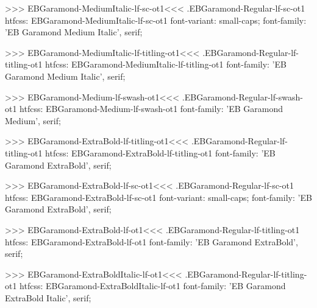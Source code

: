{{{{{{{>>>
\<EBGaramond-MediumItalic-lf-sc-ot1\><<<
.EBGaramond-Regular-lf-sc-ot1
htfcss:  EBGaramond-MediumItalic-lf-sc-ot1  font-variant: small-caps; font-family: 'EB Garamond Medium Italic', serif;

>>>
\<EBGaramond-MediumItalic-lf-titling-ot1\><<<
.EBGaramond-Regular-lf-titling-ot1
htfcss:  EBGaramond-MediumItalic-lf-titling-ot1  font-family: 'EB Garamond Medium Italic', serif;

>>>
\<EBGaramond-Medium-lf-swash-ot1\><<<
.EBGaramond-Regular-lf-swash-ot1
htfcss:  EBGaramond-Medium-lf-swash-ot1  font-family: 'EB Garamond Medium', serif;

>>>
\<EBGaramond-ExtraBold-lf-titling-ot1\><<<
.EBGaramond-Regular-lf-titling-ot1
htfcss:  EBGaramond-ExtraBold-lf-titling-ot1  font-family: 'EB Garamond ExtraBold', serif;

>>>
\<EBGaramond-ExtraBold-lf-sc-ot1\><<<
.EBGaramond-Regular-lf-sc-ot1
htfcss:  EBGaramond-ExtraBold-lf-sc-ot1  font-variant: small-caps; font-family: 'EB Garamond ExtraBold', serif;

>>>
\<EBGaramond-ExtraBold-lf-ot1\><<<
.EBGaramond-Regular-lf-titling-ot1
htfcss:  EBGaramond-ExtraBold-lf-ot1  font-family: 'EB Garamond ExtraBold', serif;

>>>
\<EBGaramond-ExtraBoldItalic-lf-ot1\><<<
.EBGaramond-Regular-lf-titling-ot1
htfcss:  EBGaramond-ExtraBoldItalic-lf-ot1  font-family: 'EB Garamond ExtraBold Italic', serif;

}}}}}}}
